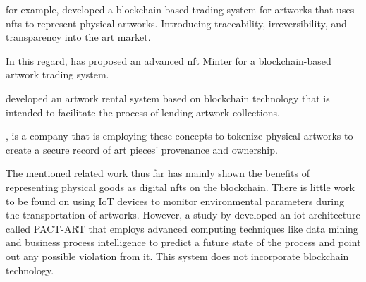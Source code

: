 \textcite{artchain} for example, developed a blockchain-based trading system for artworks that uses \glspl{nft} to represent physical artworks. Introducing traceability, irreversibility, and transparency into the art market. 

In this regard, \textcite{nftminter} has proposed an advanced \gls{nft} Minter for a blockchain-based artwork trading system. 

\textcite{artrentalblockchain} developed an artwork rental system based on blockchain technology that is intended to facilitate the process of lending artwork collections.

\textcite{artory}, is a company that is employing these concepts to tokenize physical artworks to create a secure record of art pieces' provenance and ownership. 

The mentioned related work thus far has mainly shown the benefits of representing physical goods as digital \glspl{nft} on the blockchain. There is little work to be found on using IoT devices to monitor environmental parameters during the transportation of artworks. However, a study by \textcite{pactart} developed an \gls{iot} architecture called PACT-ART that employs advanced computing techniques like data mining and business process intelligence to predict a future state of the process and point out any possible violation from it. This system does not incorporate blockchain technology.
